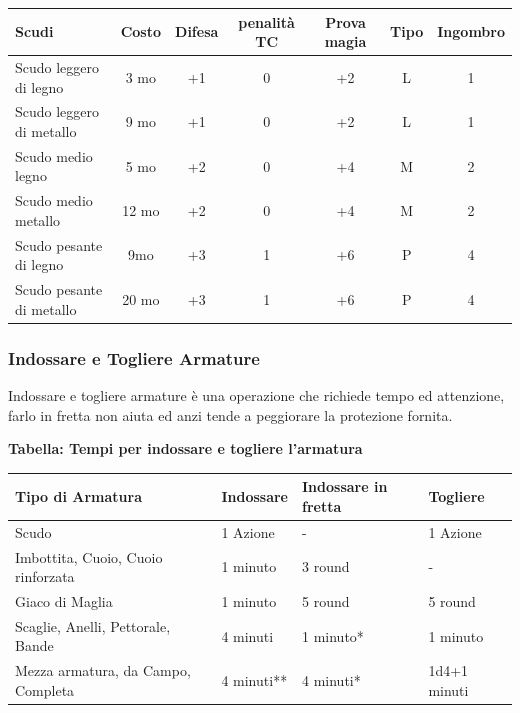\label{tabella-scudi}

\noindent\begin{tabular}{lcccccc}
	\toprule
\textbf{Scudi} & \textbf{Costo} & \textbf{Difesa} & \textbf{penalità TC} & \textbf{Prova magia} & \textbf{Tipo} & \textbf{Ingombro}\\
\toprule
Scudo leggero di legno& 3 mo&+1& 0& +2& L & 1\\
Scudo leggero di metallo & 9 mo&+1& 0& +2& L& 1\\
Scudo medio legno &5 mo &+2& 0& +4& M& 2\\
Scudo medio metallo&12 mo&+2& 0& +4& M& 2\\
Scudo pesante di legno & 9mo&+3 & 1& +6& P& 4\\
Scudo pesante di metallo & 20 mo&+3& 1& +6& P& 4\\
\end{tabular}

\begin{multicols}{2}

\subsubsection{Indossare e Togliere Armature}

Indossare e togliere armature è una operazione che richiede tempo ed attenzione, farlo in fretta non aiuta ed anzi tende a peggiorare la protezione fornita.

\end{multicols}

\textbf{Tabella: Tempi per indossare e togliere l'armatura}

\medskip

\noindent\begin{tabularx}{\linewidth}{Xlll}
	\toprule
\textbf{Tipo di Armatura}& \textbf{Indossare} & \textbf{Indossare in fretta} & \textbf{Togliere}\\
\toprule
Scudo& 1 Azione & - & 1 Azione\\
Imbottita, Cuoio, Cuoio rinforzata& 1 minuto& 3 round& - \\
Giaco di Maglia& 1 minuto& 5 round& 5 round\\
Scaglie, Anelli, Pettorale, Bande & 4 minuti & 1 minuto{*}& 1 minuto\\
Mezza armatura, da Campo, Completa& 4 minuti{*}{*}& 4 minuti{*}& 1d4+1 minuti
\end{tabularx}

